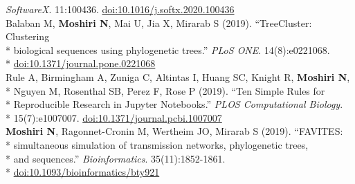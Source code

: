\documentclass[margin,line]{res}
\begin{document}
\begin{resume}
\hspace*{8mm} \textit{SoftwareX}. 11:100436. \href{https://doi.org/10.1016/j.softx.2020.100436}{doi:10.1016/j.softx.2020.100436}\\
\hspace*{4mm} Balaban M, \textbf{Moshiri N}, Mai U, Jia X, Mirarab S (2019). ``TreeCluster: Clustering\\*
\hspace*{9mm} biological sequences using phylogenetic trees.'' \textit{PLoS ONE}. 14(8):e0221068.\\*\vspace{2mm}
\hspace*{8mm} \href{https://doi.org/10.1371/journal.pone.0221068}{doi:10.1371/journal.pone.0221068}\\
\hspace*{4mm} Rule A, Birmingham A, Zuniga C, Altintas I, Huang SC, Knight R, \textbf{Moshiri N},\\*
\hspace*{9mm} Nguyen M, Rosenthal SB, Perez F, Rose P (2019). ``Ten Simple Rules for\\*
\hspace*{9mm} Reproducible Research in Jupyter Notebooks.'' \textit{PLOS Computational Biology}.\\*\vspace{2mm}
\hspace*{8mm} 15(7):e1007007. \href{https://doi.org/10.1371/journal.pcbi.1007007}{doi:10.1371/journal.pcbi.1007007}\\
\hspace*{4mm} \textbf{Moshiri N}, Ragonnet-Cronin M, Wertheim JO, Mirarab S (2019). ``FAVITES:\\*
\hspace*{9mm} simultaneous simulation of transmission networks, phylogenetic trees,\\*
\hspace*{9mm} and sequences.'' \textit{Bioinformatics}. 35(11):1852-1861.\\*\vspace{2mm}
\hspace*{8mm} \href{https://doi.org/10.1093/bioinformatics/bty921}{doi:10.1093/bioinformatics/bty921}\\

\end{resume}
\end{document}
